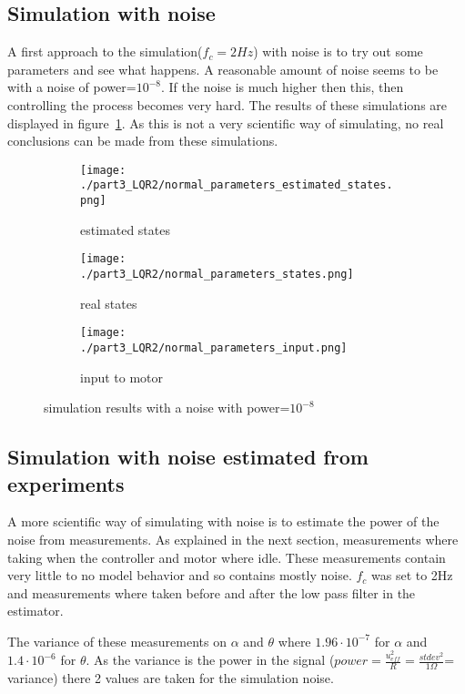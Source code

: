 \subsection{Simulation with noise}
	A first approach to the simulation($f_c=2Hz$) with noise is to try out some parameters and see what happens. A reasonable amount of noise seems to be with a noise of power=$10^{-8}$. If the noise is much higher then this, then controlling the process becomes very hard. The results of these simulations are displayed in figure~\ref{fig:simulation results with a noise with power=$10^{-8}$}. As this is not a very scientific way of simulating, no real conclusions can be made from these simulations.
	\begin{figure}[H]
		\centering
		\begin{subfigure}[b]{0.45\textwidth}
			\texttt{[image: ./part3\_LQR2/normal\_parameters\_estimated\_states.png]}
			\caption{estimated states}
		\end{subfigure}
		\begin{subfigure}[b]{0.45\textwidth}
			\texttt{[image: ./part3\_LQR2/normal\_parameters\_states.png]}
			\caption{real states}
		\end{subfigure}
		\begin{subfigure}[b]{0.45\textwidth}
			\texttt{[image: ./part3\_LQR2/normal\_parameters\_input.png]}
			\caption{input to motor}
		\end{subfigure}
		\caption{simulation results with a noise with power=$10^{-8}$}
		\label{fig:simulation results with a noise with power=$10^{-8}$}
	\end{figure}
\subsection{Simulation with noise estimated from experiments}
	A more scientific way of simulating with noise is to estimate the power of the noise from measurements. As explained in the next section, measurements where taking when the controller and motor where idle. These measurements contain very little to no model behavior and so contains mostly noise. $f_c$ was set to 2Hz and measurements where taken before and after the low pass filter in the estimator. 
	
	The variance of these measurements on $\alpha$ and $\theta$ where $1.96 \cdot 10^{-7}$ for $\alpha$ and $1.4 \cdot 10^{-6}$ for $\theta$. As the variance is the power in the signal ($power = \frac{u_{eff}^2}{R} = \frac{stdev^2}{1 \Omega}$= variance) there 2 values are taken for the simulation noise.
	
